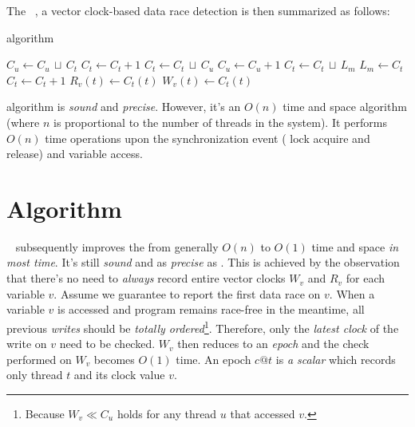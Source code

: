 The \Djitp{}~\cite{Pozniansky:2003p263}, a vector clock-based data race detection is then summarized as follows:
\begin{algorithm}
	\caption{\Djitp{} algorithm}
	\begin{algorithmic}[1]
			\State $C_u \gets C_u\,\sqcup\,C_t$
			\State $C_t \gets C_t + 1$
		\EndProcedure
		\Statex
			\State $C_t \gets C_t\,\sqcup\,C_u$
			\State $C_u \gets C_u + 1$
		\EndProcedure
		\Statex
			\State $C_t \gets C_t\,\sqcup\,L_m$
		\EndProcedure
		\Statex
			\State $L_m \gets C_t$
			\State $C_t \gets C_t + 1$
		\EndProcedure
		\Statex
				\State {}
			\EndIf
			\State $R_v(t) \gets C_t(t)$
		\EndProcedure
		\Statex
				\State {}
			\EndIf
				\State {}
			\EndIf
			\State $W_v(t) \gets C_t(t)$
		\EndProcedure
	\end{algorithmic}
\end{algorithm}

\Djitp{} algorithm is \textit{sound} and \textit{precise}. However, it's an $O(n)$ time and space algorithm (where $n$ is proportional to the number of threads in the system). It performs $O(n)$ time operations upon the synchronization event (\eg{} lock acquire and release) and variable access.

\section{\FastTrack{} Algorithm}
\label{s:FastTrack}
\FastTrack~\cite{Flanagan:2009p3} subsequently improves the \Djitp{} from generally $O(n)$ to $O(1)$ time and space \textit{in most time}. It's still \textit{sound} and as \textit{precise} as \Djitp{}. This is achieved by the observation that there's no need to \textit{always} record entire vector clocks $W_v$ and $R_v$ for each variable $v$. Assume we guarantee to report the first data race on $v$. When a variable $v$ is accessed and program remains race-free in the meantime, all previous \textit{writes} should be \textit{totally ordered}\footnote{Because $W_v \ll C_u$ holds for any thread $u$ that accessed $v$.}. Therefore, only the \textit{latest clock} of the write on $v$ need to be checked. $W_v$ then reduces to an \textit{epoch} and the check performed on $W_v$ becomes $O(1)$ time. An epoch $c@t$ is \textit{a scalar} which records only thread $t$ and its clock value $v$.

